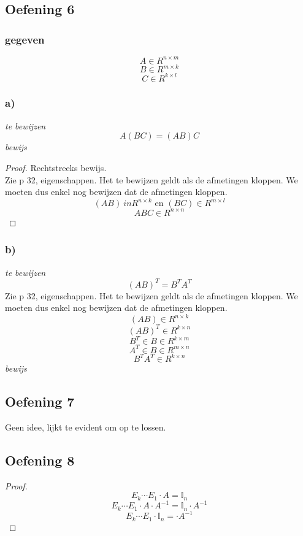 \documentclass[lineaire_algebra_oplossingen.tex]{subfiles}
\begin{document}
\subsection{Oefening 6}
\subsubsection*{gegeven}
\[
A \in R^{n\times m}
\]
\[
B \in R^{m\times k}
\]
\[
C \in R^{k\times l}
\]
\subsubsection*{a)}
\emph{te bewijzen}
\[
A(BC) = (AB)C
\]
\emph{bewijs}
\begin{proof}
Rechtstreeks bewijs.\\
Zie p 32, eigenschappen. Het te bewijzen geldt als de afmetingen kloppen.
We moeten dus enkel nog bewijzen dat de afmetingen kloppen.
\[
(AB) \ in R^{n\times k} \text{ en } (BC) \in R^{m\times l}
\]
\[
ABC \in  R^{n\times n}
\]
\end{proof}

\subsubsection*{b)}
\emph{te bewijzen}
\[
(AB)^{T} = B^{T}A^{T}
\]
Zie p 32, eigenschappen. Het te bewijzen geldt als de afmetingen kloppen.
We moeten dus enkel nog bewijzen dat de afmetingen kloppen.
\[
(AB) \in R^{n\times k}
\]
\[
(AB)^T \in R^{k\times n}
\]
\[
B^{T} \in B \in R^{k\times m}
\]
\[
A^{T} \in B \in R^{m\times n}
\]
\[
 B^{T}A^{T} \in R^{k\times n}
\]
\emph{bewijs}
\subsection{Oefening 7}
Geen idee, lijkt te evident om op te lossen.

\subsection{Oefening 8}
\begin{proof}
\[
E_k\cdots E_1\cdot A = \mathbb{I}_n
\]
\[
E_k\cdots E_1\cdot A \cdot A^{-1} = \mathbb{I}_n \cdot A^{-1} 
\]
\[
E_k\cdots E_1\cdot \mathbb{I}_n =  \cdot A^{-1} 
\]
\end{proof}
\end{document}
